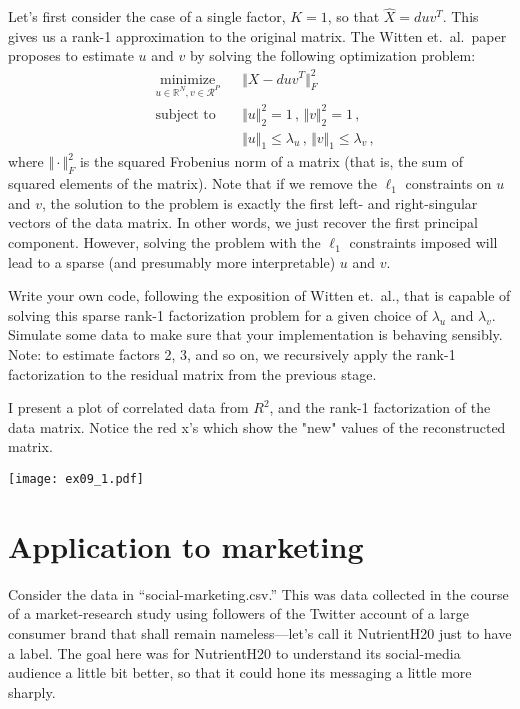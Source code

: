 \documentclass{article}
\newcommand{\R}{\mathbb{R}}
\begin{document}
Let's first consider the case of a single factor, $K=1$, so that $\hat{X} = d u v^T$.  This gives us a rank-1 approximation to the original matrix. The Witten et.~al.~paper proposes to estimate $u$ and $v$ by solving the following optimization problem:
\begin{equation}
\begin{aligned}
& \underset{u \in \R^N, v \in \mathcal{R}^P}{\text{minimize}}
& & 
\Vert X - d u v^T \Vert_F^2 \\
& \text{subject to}
& & \Vert u \Vert_2^2 = 1 \, , \, \Vert v \Vert_2^2 = 1 \, , \\
 & & & \Vert u \Vert_1 \leq \lambda_u \, , \, \Vert v \Vert_1 \leq \lambda_v \, ,
\end{aligned}
\end{equation}
where $\Vert \cdot \Vert_F^2$ is the squared Frobenius norm of a matrix (that is, the sum of squared elements of the matrix).  Note that if we remove the $\ell_1$ constraints on $u$ and $v$, the solution to the problem is exactly the first left- and right-singular vectors of the data matrix.  In other words, we just recover the first principal component.  However, solving the problem with the $\ell_1$ constraints imposed will lead to a sparse (and presumably more interpretable) $u$ and $v$.

Write your own code, following the exposition of Witten et.~al., that is capable of solving this sparse rank-1 factorization problem for a given choice of $\lambda_u$ and $\lambda_v$.  Simulate some data to make sure that your implementation is behaving sensibly.  Note: to estimate factors 2, 3, and so on, we recursively apply the rank-1 factorization to the residual matrix from the previous stage.

\color{blue}
I present a plot of correlated data from $R^2$, and the rank-1 factorization of the data matrix. Notice the red x's which show the "new" values of the reconstructed matrix. 
\begin{center}
\texttt{[image: ex09\_1.pdf]}
\end{center}
\color{black}

\section{Application to marketing}

Consider the data in ``social-marketing.csv.''  This was data collected in the course of a market-research study using followers of the Twitter account of a large consumer brand that shall remain nameless---let's call it NutrientH20 just to have a label. The goal here was for NutrientH20 to understand its social-media audience a little bit better, so that it could hone its messaging a little more sharply.
\end{document}
